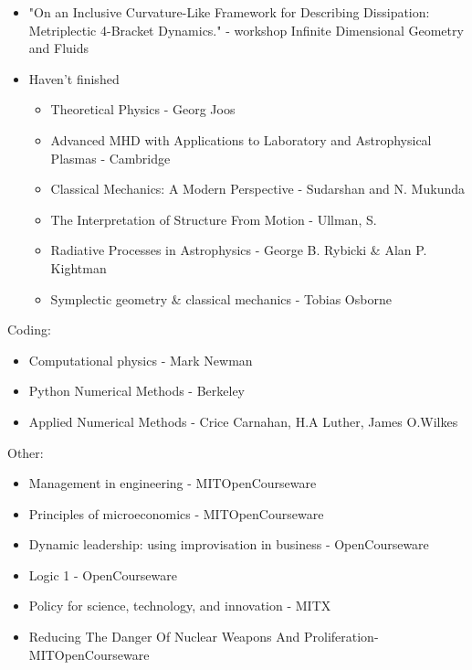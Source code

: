 \begin{itemize}
    \item "On an Inclusive Curvature-Like Framework for Describing Dissipation: Metriplectic 4-Bracket Dynamics." - workshop Infinite Dimensional Geometry and Fluids
    \item Haven’t finished
    \begin{itemize}
        \item Theoretical Physics - Georg Joos
        \item Advanced MHD with Applications to Laboratory and Astrophysical Plasmas - Cambridge
        \item Classical Mechanics: A Modern Perspective - Sudarshan and N. Mukunda
        \item The Interpretation of Structure From Motion - Ullman, S.
        \item Radiative Processes in Astrophysics - George B. Rybicki \& Alan P. Kightman
        \item Symplectic geometry \& classical mechanics - Tobias Osborne
    \end{itemize}

\end{itemize}
Coding:
\begin{itemize}
    \item Computational physics - Mark Newman
    \item Python Numerical Methods - Berkeley 
    \item Applied Numerical Methods - Crice Carnahan, H.A Luther, James O.Wilkes
\end{itemize}
Other:
\begin{itemize}
    \item Management in engineering - MITOpenCourseware
    \item Principles of microeconomics - MITOpenCourseware
    \item Dynamic leadership: using improvisation in business  - OpenCourseware
    \item Logic 1 - OpenCourseware
    \item Policy for science, technology, and innovation -  MITX
    \item Reducing The Danger Of Nuclear Weapons And Proliferation- MITOpenCourseware

\end{itemize}
